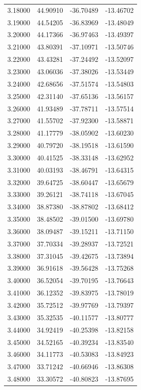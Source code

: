 \begin{table}
\begin{tabular}{llll}
3.18000 & 44.90910 & -36.70489 & -13.46702 \\
3.19000 & 44.54205 & -36.83969 & -13.48049 \\
3.20000 & 44.17366 & -36.97463 & -13.49397 \\
3.21000 & 43.80391 & -37.10971 & -13.50746 \\
3.22000 & 43.43281 & -37.24492 & -13.52097 \\
3.23000 & 43.06036 & -37.38026 & -13.53449 \\
3.24000 & 42.68656 & -37.51574 & -13.54803 \\
3.25000 & 42.31140 & -37.65136 & -13.56157 \\
3.26000 & 41.93489 & -37.78711 & -13.57514 \\
3.27000 & 41.55702 & -37.92300 & -13.58871 \\
3.28000 & 41.17779 & -38.05902 & -13.60230 \\
3.29000 & 40.79720 & -38.19518 & -13.61590 \\
3.30000 & 40.41525 & -38.33148 & -13.62952 \\
3.31000 & 40.03193 & -38.46791 & -13.64315 \\
3.32000 & 39.64725 & -38.60447 & -13.65679 \\
3.33000 & 39.26121 & -38.74118 & -13.67045 \\
3.34000 & 38.87380 & -38.87802 & -13.68412 \\
3.35000 & 38.48502 & -39.01500 & -13.69780 \\
3.36000 & 38.09487 & -39.15211 & -13.71150 \\
3.37000 & 37.70334 & -39.28937 & -13.72521 \\
3.38000 & 37.31045 & -39.42675 & -13.73894 \\
3.39000 & 36.91618 & -39.56428 & -13.75268 \\
3.40000 & 36.52054 & -39.70195 & -13.76643 \\
3.41000 & 36.12352 & -39.83975 & -13.78019 \\
3.42000 & 35.72512 & -39.97769 & -13.79397 \\
3.43000 & 35.32535 & -40.11577 & -13.80777 \\
3.44000 & 34.92419 & -40.25398 & -13.82158 \\
3.45000 & 34.52165 & -40.39234 & -13.83540 \\
3.46000 & 34.11773 & -40.53083 & -13.84923 \\
3.47000 & 33.71242 & -40.66946 & -13.86308 \\
3.48000 & 33.30572 & -40.80823 & -13.87695 \\

\end{tabular}
\end{table}
